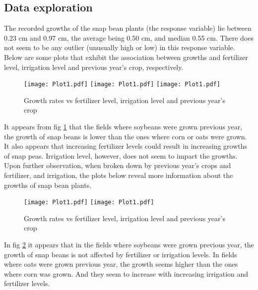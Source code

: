 \documentclass[11pt,a4paper]{article}
\begin{document}
\subsection*{Data exploration}
The recorded growths of the snap bean plants (the response variable) lie between 0.23 cm and 0.97 cm, the average being 0.50 cm, and median 0.55 cm. There does not seem to be any outlier (unusually high or low) in this response variable. Below are some plots that exhibit the association between growths and fertilizer level, irrigation level and previous year's crop, respectively. 
\begin{figure}[H]
\begin{center}
\texttt{[image: Plot1.pdf]}
\texttt{[image: Plot1.pdf]}
\texttt{[image: Plot1.pdf]}
\end{center}
\caption{Growth rates vs fertilizer level, irrigation level and previous year's crop}
\label{fig:Fig1_1}
\end{figure}
It appears from fig \ref{fig:Fig1_1} that the fields where soybeans were grown previous year, the growth of snap beans is lower than the ones where corn or oats were grown. It also appears that increasing fertilizer levels could result in increasing growths of snap peas. Irrigation level, however, does not seem to impact the growths. Upon further observation, when broken down by previous year's crops and fertilizer, and irrigation, the plots below reveal more information about the growths of snap bean plants.
\begin{figure}[H]
\begin{center}
\texttt{[image: Plot1.pdf]}
\texttt{[image: Plot1.pdf]}
\end{center}
\caption{Growth rates vs fertilizer level, irrigation level and previous year's crop}
\label{fig:Fig1_2}
\end{figure}
In fig \ref{fig:Fig1_2} it appears that in the fields where soybeans were grown previous year, the growth of snap beans is not affected by fertilizer or irrigation levels. In fields where oats were grown previous year, the growth seems higher than the ones where corn was grown. And they seem to increase with increasing irrigation and fertilizer levels. 
\end{document}
